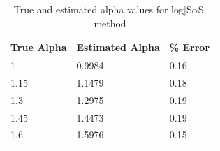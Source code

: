 \begin{table}[H]
	\center
    \begin{tabular}{|l|l|l|}
    \hline
    True Alpha & Estimated Alpha & \% Error \\ \hline
    1          & 0.9984          & 0.16     \\ \hline
    1.15       & 1.1479          & 0.18     \\ \hline
    1.3        & 1.2975          & 0.19     \\ \hline
    1.45       & 1.4473          & 0.19     \\ \hline
    1.6        & 1.5976          & 0.15     \\ \hline
    \end{tabular}
    \caption{True and estimated alpha values for log|S$\alpha$S| method}
    \label{tab:resalpha}
\end{table}